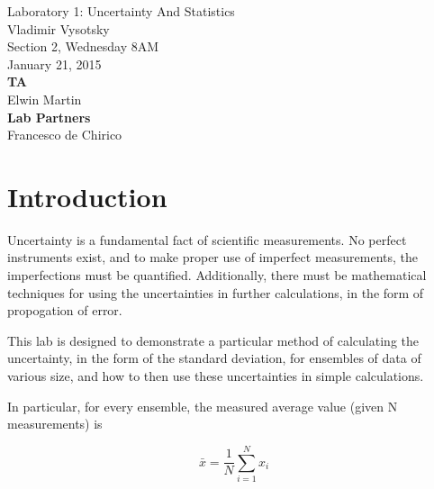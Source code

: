 \documentclass[journal]{IEEEtran}
\begin{document}
\newcommand{\labtitlepage}{
	\onecolumn
	\thispagestyle{empty} \vspace*{\fill}
	\begin{center}
		\LARGE\labtitle \\ \bigskip \bigskip \large\name \\ \bigskip
		\labsection \\ \bigskip \labdate \\ \bigskip \bigskip
		\textbf{TA} \\ \taname \\ \bigskip \textbf{Lab Partners} \\
		\partnername \\
	\end{center}
	\vspace*{\fill} \vspace*{\fill} \newpage
	\setcounter{page}{1}
	\twocolumn
}

\newcommand{\labtitle}{Laboratory 1: Uncertainty And Statistics}
\newcommand{\name}{Vladimir Vysotsky}
\newcommand{\labsection}{Section 2, Wednesday 8AM}
\newcommand{\labdate}{January 21, 2015}
\newcommand{\taname}{Elwin Martin}
\newcommand{\partnername}{Francesco de Chirico}

\labtitlepage

\section{Introduction}
Uncertainty is a fundamental fact of scientific measurements. No perfect
instruments exist, and to make proper use of imperfect measurements, the
imperfections must be quantified. Additionally, there must be mathematical
techniques for using the uncertainties in further calculations, in the form of
propogation of error.

This lab is designed to demonstrate a particular method of calculating the
uncertainty, in the form of the standard deviation, for ensembles of data of
various size, and how to then use these uncertainties in simple calculations.

In particular, for every ensemble, the measured average value (given N
measurements) is

\begin{equation}
\label{average}
\bar x = \frac{1}{N} \sum_{i=1}^N x_i
\end{equation}
\end{document}
